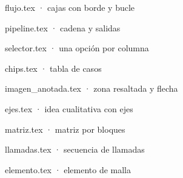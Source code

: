 \documentclass[aspectratio=169,11pt]{beamer}
\begin{document}
\begin{frame}{flujo.tex · cajas con borde y bucle}\centering\end{frame}
\begin{frame}{pipeline.tex · cadena y salidas}\centering\end{frame}
\begin{frame}{selector.tex · una opción por columna}\centering{}\end{frame}
\begin{frame}{chips.tex · tabla de casos}\centering
\end{frame}
\begin{frame}{imagen\_anotada.tex · zona resaltada y flecha}\centering\end{frame}
\begin{frame}{ejes.tex · idea cualitativa con ejes}\centering\end{frame}
\begin{frame}{matriz.tex · matriz por bloques}\centering\end{frame}
\begin{frame}{llamadas.tex · secuencia de llamadas}\centering\end{frame}
\begin{frame}{elemento.tex · elemento de malla}\centering\end{frame}
\end{document}
